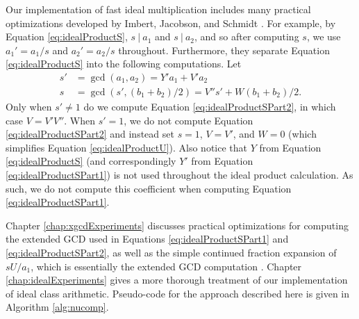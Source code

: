 \documentclass{ucalgthes1}
\theoremstyle{definition}
\begin{document}
Our implementation of fast ideal multiplication includes many practical optimizations developed by Imbert, Jacobson, and Schmidt \cite[Algorithm~6]{Imbert2010}.  For example, by Equation \ref{eq:idealProductS}, $s ~|~ a_1$ and $s ~|~ a_2$, and so after computing $s$, we use ${a_1}' = a_1/s$ and ${a_2}' = a_2/s$ throughout.  Furthermore, they separate Equation \ref{eq:idealProductS} into the following computations. Let
\begin{align}
s' &= \gcd(a_1, a_2) = Y'a_1 + V'a_2 \label{eq:idealProductSPart1} \\
s  &= \gcd(s', (b_1 + b_2)/2) = V''s'+W(b_1+b_2)/2. \label{eq:idealProductSPart2} 
\end{align}
Only when $s' \neq 1$ do we compute Equation \ref{eq:idealProductSPart2}, in which case $V = V'V''$.  When $s' = 1$, we do not compute Equation \ref{eq:idealProductSPart2} and instead set $s = 1$, $V = V'$, and $W=0$ (which simplifies Equation \ref{eq:idealProductU}).  Also notice that $Y$ from Equation \ref{eq:idealProductS} (and correspondingly $Y'$ from Equation \ref{eq:idealProductSPart1}) is not used throughout the ideal product calculation.  As such, we do not compute this coefficient when computing Equation \ref{eq:idealProductSPart1}.

Chapter \ref{chap:xgcdExperiments} discusses practical optimizations for computing the extended GCD used in Equations \ref{eq:idealProductSPart1} and \ref{eq:idealProductSPart2}, as well as the simple continued fraction expansion of $sU/a_1$, which is essentially the extended GCD computation \cite[\S 3.2]{Jacobson2009}.  Chapter \ref{chap:idealExperiments} gives a more thorough treatment of our implementation of ideal class arithmetic.  Pseudo-code for the approach described here is given in Algorithm \ref{alg:nucomp}.
\end{document}
